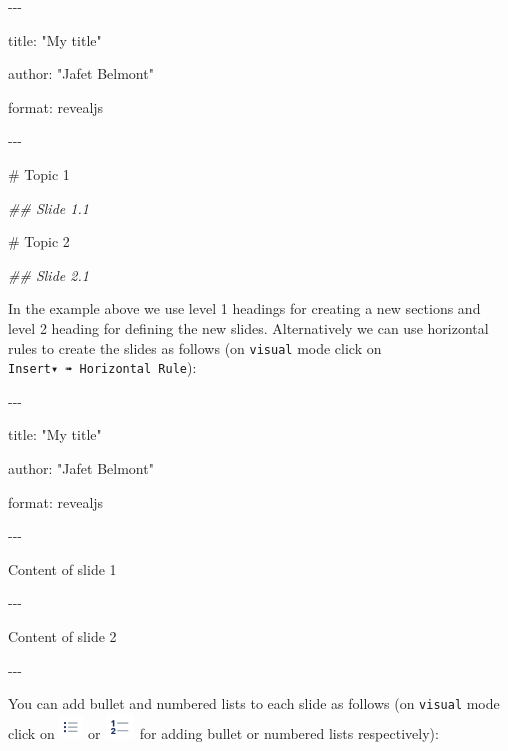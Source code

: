 \documentclass[
  letterpaper,
  DIV=11,
  numbers=noendperiod]{scrartcl}
\newenvironment{Shaded}{\begin{snugshade}}{\end{snugshade}}
\newcommand{\CommentTok}[1]{\textcolor[rgb]{0.37,0.37,0.37}{#1}}
\newcommand{\DecValTok}[1]{\textcolor[rgb]{0.68,0.00,0.00}{#1}}
\newcommand{\DocumentationTok}[1]{\textcolor[rgb]{0.37,0.37,0.37}{\textit{#1}}}
\newcommand{\NormalTok}[1]{\textcolor[rgb]{0.00,0.23,0.31}{#1}}
\newcommand{\SpecialCharTok}[1]{\textcolor[rgb]{0.37,0.37,0.37}{#1}}
\newcommand{\StringTok}[1]{\textcolor[rgb]{0.13,0.47,0.30}{#1}}
\begin{document}
\begin{Shaded}
\begin{Highlighting}[]

\SpecialCharTok{{-}{-}{-}}

\NormalTok{title}\SpecialCharTok{:} \StringTok{"My title"}

\NormalTok{author}\SpecialCharTok{:} \StringTok{"Jafet Belmont"}

\NormalTok{format}\SpecialCharTok{:}\NormalTok{ revealjs}

\SpecialCharTok{{-}{-}{-}}

\CommentTok{\# Topic 1}

\DocumentationTok{\#\# Slide 1.1}

\CommentTok{\# Topic 2}

\DocumentationTok{\#\# Slide 2.1}
\end{Highlighting}
\end{Shaded}

In the example above we use level 1 headings for creating a new sections
and level 2 heading for defining the new slides. Alternatively we can
use horizontal rules to create the slides as follows (on \texttt{visual}
mode click on \texttt{Insert▾\ ➠\ Horizontal\ Rule}):

\begin{Shaded}
\begin{Highlighting}[]

\SpecialCharTok{{-}{-}{-}}

\NormalTok{title}\SpecialCharTok{:} \StringTok{"My title"}

\NormalTok{author}\SpecialCharTok{:} \StringTok{"Jafet Belmont"}

\NormalTok{format}\SpecialCharTok{:}\NormalTok{ revealjs}

\SpecialCharTok{{-}{-}{-}}

\NormalTok{  Content of slide }\DecValTok{1}

\SpecialCharTok{{-}{-}{-}}

\NormalTok{  Content of slide }\DecValTok{2}

\SpecialCharTok{{-}{-}{-}}
\end{Highlighting}
\end{Shaded}

You can add bullet and numbered lists to each slide as follows (on
\texttt{visual} mode click on
\includegraphics[width=0.25in,height=0.26042in]{images/bullets.png} or
\includegraphics[width=0.3125in,height=0.26042in]{images/numbered.png}
for adding bullet or numbered lists respectively):
\end{document}
